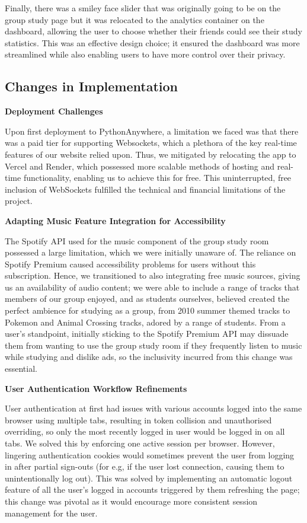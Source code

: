 Finally, there was a smiley face slider that was originally going to be on the group study page but it was relocated to the analytics container on the dashboard, allowing the user to choose whether their friends could see their study statistics. This was an effective design choice; it ensured the dashboard was more streamlined while also enabling users to have more control over their privacy.

\subsection{Changes in Implementation}
\textbf{Deployment Challenges}

Upon first deployment to PythonAnywhere, a limitation we faced was that there was a paid tier for supporting Websockets, which a plethora of the key real-time features of our website relied upon. Thus, we mitigated by relocating the app to Vercel and Render, which possessed more scalable methods of hosting and real-time functionality, enabling us to achieve this for free. This uninterrupted, free inclusion of WebSockets fulfilled the technical and financial limitations of the project.

\textbf{Adapting Music Feature Integration for Accessibility}

The Spotify API used for the music component of the group study room possessed a large limitation, which we were initially unaware of. The reliance on Spotify Premium caused accessibility problems for users without this subscription. Hence, we transitioned to also integrating free music sources, giving us an availability of audio content; we were able to include a range of tracks that members of our group enjoyed, and as students ourselves, believed created the perfect ambience for studying as a group, from 2010 summer themed tracks to Pokemon and Animal Crossing tracks, adored by a range of students. From a user's standpoint, initially sticking to the Spotify Premium API may dissuade them from wanting to use the group study room if they frequently listen to music while studying and dislike ads, so the inclusivity incurred from this change was essential.

\textbf{User Authentication Workflow Refinements}

User authentication at first had issues with various accounts logged into the same browser using multiple tabs, resulting in token collision and unauthorised overriding, so only the most recently logged in user would be logged in on all tabs. We solved this by enforcing one active session per browser. However, lingering authentication cookies would sometimes prevent the user from logging in after partial sign-outs (for e.g, if the user lost connection, causing them to unintentionally log out). This was solved by implementing an automatic logout feature of all the user's logged in accounts triggered by them refreshing the page; this change was pivotal as it would encourage more consistent session management for the user.

